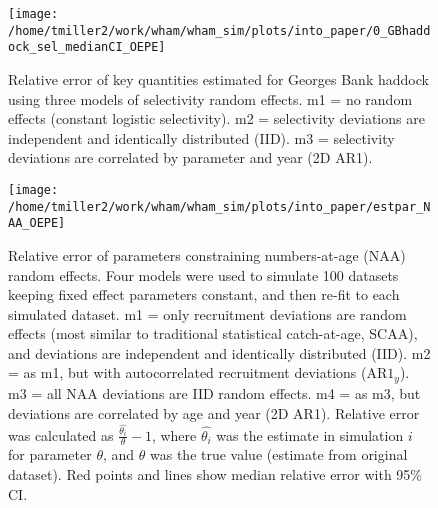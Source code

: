 \documentclass[]{article}
\begin{document}
\pagebreak

\begin{figure}

{\centering \texttt{[image: /home/tmiller2/work/wham/wham\_sim/plots/into\_paper/0\_GBhaddock\_sel\_medianCI\_OEPE]} 

}

\caption{Relative error of key quantities estimated for Georges Bank haddock using three models of selectivity random effects. m1 = no random effects (constant logistic selectivity). m2 = selectivity deviations are independent and identically distributed (IID). m3 = selectivity deviations are correlated by parameter and year (2D AR1).}\label{fig:rel-error-GBhaddock-sel}
\end{figure}

\pagebreak

\begin{figure}

{\centering \texttt{[image: /home/tmiller2/work/wham/wham\_sim/plots/into\_paper/estpar\_NAA\_OEPE]} 

}

\caption{Relative error of parameters constraining numbers-at-age (NAA) random effects. Four models were used to simulate 100 datasets keeping fixed effect parameters constant, and then re-fit to each simulated dataset. m1 = only recruitment deviations are random effects (most similar to traditional statistical catch-at-age, SCAA), and deviations are independent and identically distributed (IID). m2 = as m1, but with autocorrelated recruitment deviations ($\text{AR1}_y$). m3 = all NAA deviations are IID random effects. m4 = as m3, but deviations are correlated by age and year (2D AR1). Relative error was calculated as $\frac{\hat{\theta_i}}{\theta} - 1$, where $\hat{\theta_i}$ was the estimate in simulation $i$ for parameter $\theta$, and $\theta$ was the true value (estimate from original dataset). Red points and lines show median relative error with 95\% CI.}\label{fig:estpar-naa}
\end{figure}

\pagebreak
\end{document}
